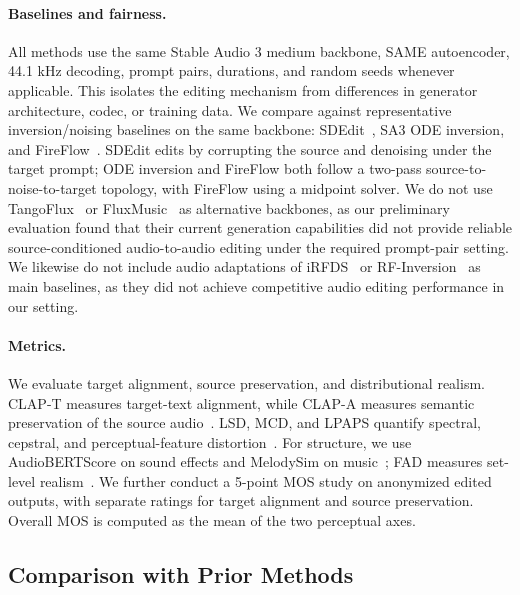 \paragraph{Baselines and fairness.}
All methods use the same Stable Audio 3 medium backbone, SAME autoencoder, 44.1 kHz decoding, prompt pairs, durations, and random seeds whenever applicable.
This isolates the editing mechanism from differences in generator architecture, codec, or training data.
We compare against representative inversion/noising baselines on the same backbone: SDEdit~\cite{meng2022sdeditguidedimagesynthesis}, SA3 ODE inversion, and FireFlow~\cite{deng2024fireflowfastinversionrectified}.
SDEdit edits by corrupting the source and denoising under the target prompt; ODE inversion and FireFlow both follow a two-pass source-to-noise-to-target topology, with FireFlow using a midpoint solver.
We do not use TangoFlux~\cite{hung2024tangoflux} or FluxMusic~\cite{fei2024fluxmusic} as alternative backbones, as our preliminary evaluation found that their current generation capabilities did not provide reliable source-conditioned audio-to-audio editing under the required prompt-pair setting.
We likewise do not include audio adaptations of iRFDS~\cite{yang2025irfds} or RF-Inversion~\cite{rout2024semanticimageinversionediting} as main baselines, as they did not achieve competitive audio editing performance in our setting.

\paragraph{Metrics.}
We evaluate target alignment, source preservation, and distributional realism.
CLAP-T measures target-text alignment, while CLAP-A measures semantic preservation of the source audio~\cite{wu2024largescalecontrastivelanguageaudiopretraining}.
LSD, MCD, and LPAPS quantify spectral, cepstral, and perceptual-feature distortion~\cite{SpecVQGAN_Iashin_2021,paissan2023audio,Kong_2020}.
For structure, we use AudioBERTScore on sound effects and MelodySim on music~\cite{Kishi2026AudioBERTScore,lu2025melodysim}; FAD measures set-level realism~\cite{Kilgour_2019}.
We further conduct a 5-point MOS study on anonymized edited outputs, with separate ratings for target alignment and source preservation.
Overall MOS is computed as the mean of the two perceptual axes.

\subsection{Comparison with Prior Methods}

